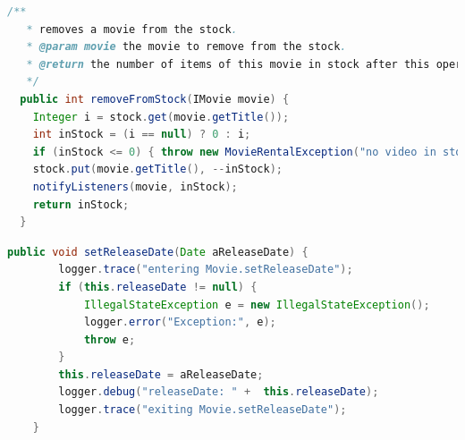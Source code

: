 \documentclass[a4paper,10pt]{article}
\begin{document}
\begin{lstlisting}[language=Java,caption=Methode mit JavaDoc, style=MyJavaStyle]
  /**
   * removes a movie from the stock.
   * @param movie the movie to remove from the stock.
   * @return the number of items of this movie in stock after this operation.
   */
  public int removeFromStock(IMovie movie) {
    Integer i = stock.get(movie.getTitle());
    int inStock = (i == null) ? 0 : i;
    if (inStock <= 0) { throw new MovieRentalException("no video in stock"); }
    stock.put(movie.getTitle(), --inStock);
    notifyListeners(movie, inStock);
    return inStock;
  }
\end{lstlisting}

\begin{lstlisting}[language=Java,caption=Log4j, style=MyJavaStyle]
    public void setReleaseDate(Date aReleaseDate) {
        logger.trace("entering Movie.setReleaseDate");
        if (this.releaseDate != null) {
            IllegalStateException e = new IllegalStateException();
            logger.error("Exception:", e);
            throw e;
        }
        this.releaseDate = aReleaseDate;
        logger.debug("releaseDate: " +  this.releaseDate);
        logger.trace("exiting Movie.setReleaseDate");
    }
\end{lstlisting}
\end{document}
